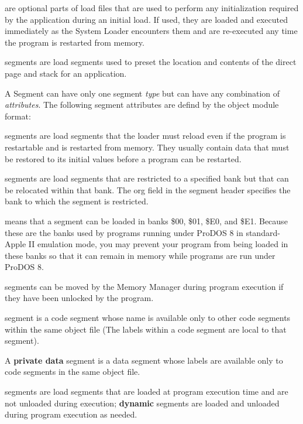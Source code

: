  are optional parts of load
files that are used to perform any initialization required by the
application during an initial load. If used, they are loaded and executed
immediately as the System Loader encounters them and are re-executed any
time the program is restarted from memory.

 segments are load segments used to
preset the location and contents of the direct page and stack for an
application.
\smallskip

\description
A Segment can have only one segment {\it type} but can have any combination
of {\it attributes}. The following segment attributes are defind by the
object module format:

 segments are load segments that the loader
must reload even if the program is restartable and is restarted from
memory. They usually contain data that must be restored to its initial
values before a program can be restarted.

 segments are load segments that are
restricted to a specified bank but that can be relocated within that bank.
The {\omf org} field in the segment header specifies the bank to which the
segment is restricted.

 means that a segment can
be loaded in banks \$00, \$01, \$E0, and \$E1. Because these are the banks
used by programs running under ProDOS 8 in standard-Apple II emulation mode,
you may prevent your program from being loaded in these banks so that it can
remain in memory while programs are run under ProDOS 8.

 segments can be moved by the
Memory Manager during program execution if they have been unlocked by the
program.

 segment is a code segment whose name is
available only to other code segments within the same object file (The
labels within a code segment are local to that segment).

\segtype A {\bf private data} segment is a data segment whose labels
are available only to code segments in the same object file.

 segments are load segments that are loaded at
program execution time and are not unloaded during execution; {\bf dynamic}
segments are loaded and unloaded during program execution as needed.

